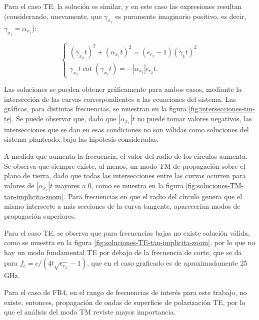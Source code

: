 Para el caso TE, la solución es similar, y en este caso las expresiones resultan (considerando, nuevamente, que $\gamma_{x_1}$ es puramente imaginario positivo, es decir, $\gamma_{x_1} = \alpha_{x_1}$):

\begin{equation}
	\label{eq:sistema-ondas-superficiales-TE}
	\begin{cases}
		(\gamma_{x_2} t)^2 + (\alpha_{x_1} t)^2 = (\epsilon_{r_2} - 1) (\gamma_1 t)^2 \\
		\gamma_{x_2} t \cot (\gamma_{x_2} t) = -|\alpha_{x_1}| \epsilon_{r_2} t.
	\end{cases}
\end{equation}

Las soluciones se pueden obtener gráficamente para ambos casos, mediante la intersección de las curvas correspondientes a las ecuaciones del sistema. Las gráficas, para distintas frecuencias, se muestran en la figura \ref{fig:intersecciones-tm-te}. Se puede observar que, dado que $|\alpha_{x_1}|t$ no puede tomar valores negativos, las intersecciones que se dan en esas condiciones no son válidas como soluciones del sistema planteado, bajo las hipótesis consideradas.

A medida que aumenta la frecuencia, el valor del radio de los círculos aumenta. Se observa que siempre existe, al menos, un modo TM de propagación sobre el plano de tierra, dado que todas las intersecciones entre las curvas ocurren para valores de $|\alpha_{x_1}| t$ mayores a 0, como se muestra en la figura \ref{fig:soluciones-TM-tan-implicita-zoom}. Para frecuencias en que el radio del círculo genera que el mismo intersecte a más secciones de la curva tangente, aparecerían modos de propagación superiores.

Para el caso TE, se observa que para frecuencias bajas no existe solución válida, como se muestra en la figura \ref{fig:soluciones-TE-tan-implicita-zoom}, por lo que no hay un modo fundamental TE por debajo de la frecuencia de corte, que se da para $f_c = c/(4 t  \sqrt{\epsilon_{r_2}}-1)$, que en el caso graficado es de aproximadamente 25 GHz.

Para el caso de FR4, en el rango de frecuencias de interés para este trabajo, no existe, entonces, propagación de ondas de superficie de polarización TE, por lo que el análisis del modo TM reviste mayor importancia.


